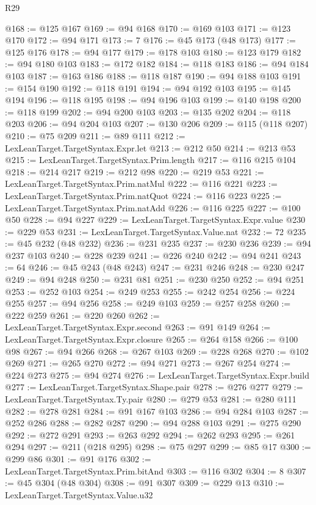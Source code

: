 \begin{lexlean}{R29}
\begin{coremodule}
@168 := @125 @167
@169 := @94 @168
@170 := @169 @103
@171 := @123 @170
@172 := @94 @171
@173 := 7
@176 := @45 @173 (@48 @173)
@177 := @125 @176
@178 := @94 @177
@179 := @178 @103
@180 := @123 @179
@182 := @94 @180 @103
@183 := @172 @182
@184 := @118 @183
@186 := @94 @184 @103
@187 := @163 @186
@188 := @118 @187
@190 := @94 @188 @103
@191 := @154 @190
@192 := @118 @191
@194 := @94 @192 @103
@195 := @145 @194
@196 := @118 @195
@198 := @94 @196 @103
@199 := @140 @198
@200 := @118 @199
@202 := @94 @200 @103
@203 := @135 @202
@204 := @118 @203
@206 := @94 @204 @103
@207 := @130 @206
@209 := @115 (@118 @207)
@210 := @75 @209
@211 := @89 @111
@212 := LexLeanTarget.TargetSyntax.Expr.let
@213 := @212 @50
@214 := @213 @53
@215 := LexLeanTarget.TargetSyntax.Prim.length
@217 := @116 @215 @104
@218 := @214 @217
@219 := @212 @98
@220 := @219 @53
@221 := LexLeanTarget.TargetSyntax.Prim.natMul
@222 := @116 @221
@223 := LexLeanTarget.TargetSyntax.Prim.natQuot
@224 := @116 @223
@225 := LexLeanTarget.TargetSyntax.Prim.natAdd
@226 := @116 @225
@227 := @100 @50
@228 := @94 @227
@229 := LexLeanTarget.TargetSyntax.Expr.value
@230 := @229 @53
@231 := LexLeanTarget.TargetSyntax.Value.nat
@232 := 72
@235 := @45 @232 (@48 @232)
@236 := @231 @235
@237 := @230 @236
@239 := @94 @237 @103
@240 := @228 @239
@241 := @226 @240
@242 := @94 @241
@243 := 64
@246 := @45 @243 (@48 @243)
@247 := @231 @246
@248 := @230 @247
@249 := @94 @248
@250 := @231 @81
@251 := @230 @250
@252 := @94 @251
@253 := @252 @103
@254 := @249 @253
@255 := @242 @254
@256 := @224 @255
@257 := @94 @256
@258 := @249 @103
@259 := @257 @258
@260 := @222 @259
@261 := @220 @260
@262 := LexLeanTarget.TargetSyntax.Expr.second
@263 := @91 @149
@264 := LexLeanTarget.TargetSyntax.Expr.closure
@265 := @264 @158
@266 := @100 @98
@267 := @94 @266
@268 := @267 @103
@269 := @228 @268
@270 := @102 @269
@271 := @265 @270
@272 := @94 @271
@273 := @267 @254
@274 := @224 @273
@275 := @94 @274
@276 := LexLeanTarget.TargetSyntax.Expr.build
@277 := LexLeanTarget.TargetSyntax.Shape.pair
@278 := @276 @277
@279 := LexLeanTarget.TargetSyntax.Ty.pair
@280 := @279 @53
@281 := @280 @111
@282 := @278 @281
@284 := @91 @167 @103
@286 := @94 @284 @103
@287 := @252 @286
@288 := @282 @287
@290 := @94 @288 @103
@291 := @275 @290
@292 := @272 @291
@293 := @263 @292
@294 := @262 @293
@295 := @261 @294
@297 := @211 (@218 @295)
@298 := @75 @297
@299 := @85 @17
@300 := @299 @86
@301 := @91 @176
@302 := LexLeanTarget.TargetSyntax.Prim.bitAnd
@303 := @116 @302
@304 := 8
@307 := @45 @304 (@48 @304)
@308 := @91 @307
@309 := @229 @13
@310 := LexLeanTarget.TargetSyntax.Value.u32

\end{coremodule}
\end{lexlean}
